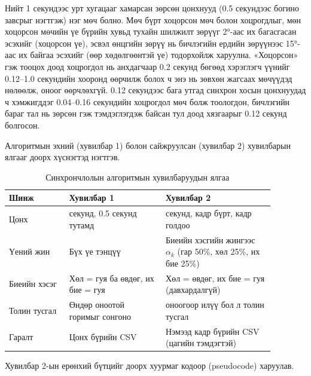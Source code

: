 Нийт 1 секундээс урт хугацааг хамарсан зөрсөн цонхнууд (0.5 секундээс богино завсрыг нэгтгэж) нэг мөч болно. Мөч бүрт хоцорсон мөч болон хоцрогдлыг, мөн хоцорсон мөчийн үе бүрийн хувьд тухайн шилжилт зөрүүг 2°-аас их багасгасан эсэхийг (хоцорсон үе), эсвэл өнцгийн зөрүү нь бичлэгийн ердийн зөрүүнээс 15°-аас их байгаа эсэхийг (өөр хөдөлгөөнтэй үе) тодорхойлж харуулна. «Хоцорсон» гэж тооцох доод хоцрогдол нь анхдагчаар 0.2 секунд бөгөөд хэрэглэгч үүнийг 0.12--1.0 секундийн хооронд өөрчилж болох ч энэ нь зөвхөн жагсаах мөчүүдэд нөлөөлж, оноог өөрчлөхгүй. 0.12 секундээс бага утгад синхрон хосын цонхнуудад ч хэмжигддэг 0.04--0.16 секундийн хоцрогдол мөч болж тоологдон, бичлэгийн бараг тал нь зөрсөн гэж тэмдэглэгдэж байсан тул доод хязгаарыг 0.12 секунд болгосон.

Алгоритмын эхний (хувилбар 1) болон сайжруулсан (хувилбар 2) хувилбарын ялгааг доорх хүснэгтэд нэгтгэв.

\begin{table}[H]
\centering
\caption{Синхрончлолын алгоритмын хувилбаруудын ялгаа}
\label{tab:versions}
\small
\begin{tabular}{|>{\raggedright\arraybackslash}p{0.200\linewidth}|>{\raggedright\arraybackslash}p{0.320\linewidth}|>{\raggedright\arraybackslash}p{0.360\linewidth}|}
\hline
\textbf{Шинж} & \textbf{Хувилбар 1} & \textbf{Хувилбар 2} \\ \hline
Цонх & 3 секунд, 0.5 секунд тутамд & 2 секунд, кадр бүрт, кадр голдоо \\ \hline
Үений жин & Бүх үе тэнцүү & Биеийн хэсгийн жингээс \(\alpha_k\) (гар 50\%, хөл 25\%, их бие 25\%) \\ \hline
Биеийн хэсэг & Хөл = гуя ба өвдөг, их бие = гуя & Хөл = өвдөг, их бие = гуя (давхардалгүй) \\ \hline
Толин тусгал & Өндөр оноотой горимыг сонгоно & 5 оноогоор илүү бол л толин тусгал \\ \hline
Гаралт & Цонх бүрийн CSV & Нэмээд кадр бүрийн CSV (цагийн тэмдэгтэй) \\ \hline
\end{tabular}
\end{table}

Хувилбар 2-ын ерөнхий бүтцийг доорх хуурмаг кодоор (pseudocode) харуулав.

